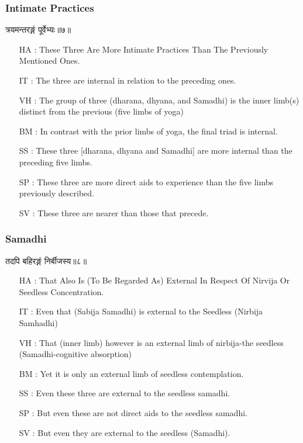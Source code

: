 \begin{frame}[fragile]\frametitle{Intimate Practices}
\begin{sanskrit}
त्रयमन्तरङ्गं पूर्वेभ्यः॥७॥
\end{sanskrit}

	\begin{itemize}
	\item [HA]: These Three Are More Intimate Practices Than The Previously Mentioned Ones.
	\item [IT]: The three are internal in relation to the preceding ones.
	\item [VH]: The group of three (dharana, dhyana, and Samadhi) is the inner limb(s) distinct from the previous (five limbs of yoga)
	\item [BM]: In contrast with the prior limbs of yoga, the final triad is internal.
	\item [SS]: These three [dharana, dhyana and Samadhi] are more internal than the preceding five limbs.
	\item [SP]: These three are more direct aids to experience than the five limbs previously described.
	\item [SV]: These three are nearer than those that precede. 
	\end{itemize}
\end{frame}


\begin{frame}[fragile]\frametitle{Samadhi}
\begin{sanskrit}
तदपि बहिरङ्गं निर्बीजस्य॥८॥
\end{sanskrit}

	\begin{itemize}
	\item [HA]: That Also Is (To Be Regarded As) External In Respect Of Nirvija Or Seedless Concentration.
	\item [IT]: Even that (Sabija Samadhi) is external to the Seedless (Nirbija Samhadhi)
	\item [VH]: That (inner limb) however is an external limb of nirbija-the seedless (Samadhi-cognitive absorption)
	\item [BM]: Yet it is only an external limb of seedless contemplation.
	\item [SS]: Even these three are external to the seedless samadhi.
	\item [SP]: But even these are not direct aids to the seedless samadhi.
	\item [SV]: But even they are external to the seedless (Samadhi). 
	\end{itemize}
\end{frame}


